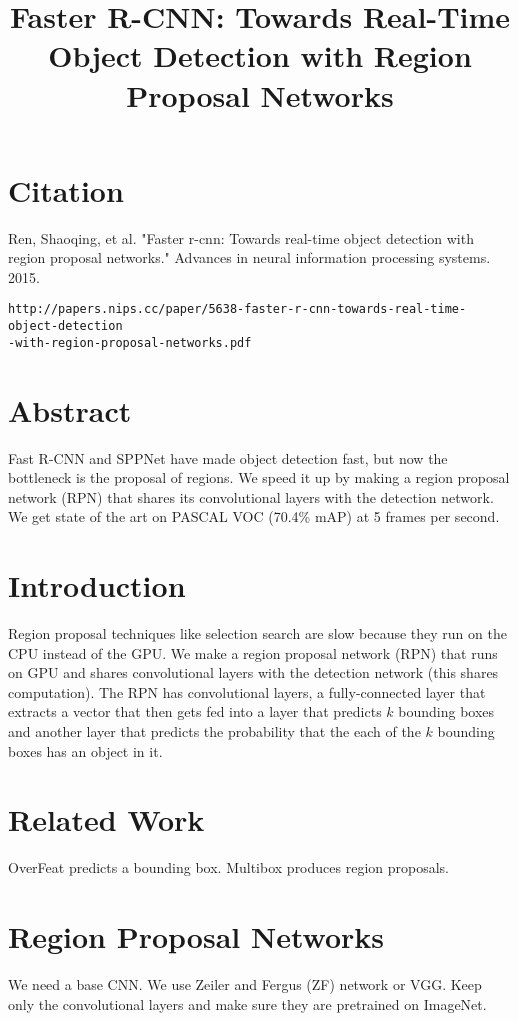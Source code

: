 \documentclass[a4paper]{article}
\title{Faster R-CNN: Towards Real-Time Object Detection with Region Proposal
Networks}
\date{}
\begin{document}
\maketitle

\section{Citation}
Ren, Shaoqing, et al. "Faster r-cnn: Towards real-time object detection with region proposal networks." Advances in neural information processing systems. 2015.

\begin{verbatim}
http://papers.nips.cc/paper/5638-faster-r-cnn-towards-real-time-object-detection
-with-region-proposal-networks.pdf
\end{verbatim}

\section{Abstract}
Fast R-CNN and SPPNet have made object detection fast, but now the bottleneck is
the proposal of regions. We speed it up by making a region proposal network
(RPN) that shares its convolutional layers with the detection network. We
get state of the art on PASCAL VOC (70.4\% mAP) at 5 frames per second.

\section{Introduction}
Region proposal techniques like selection search are slow because they run on
the CPU instead of the GPU. We make a region proposal network (RPN) that runs
on GPU and shares convolutional layers with the detection network (this
shares computation). The RPN has convolutional layers, a fully-connected layer
that extracts a vector that then gets fed into a layer that predicts $k$
bounding boxes and another layer that predicts the probability that the
each of the $k$ bounding boxes has an object in it.

\section{Related Work}
OverFeat predicts a bounding box. Multibox produces region proposals.

\section{Region Proposal Networks}
We need a base CNN. We use Zeiler and Fergus (ZF) network or VGG. Keep only the
convolutional layers and make sure they are pretrained on ImageNet.
\end{document}
